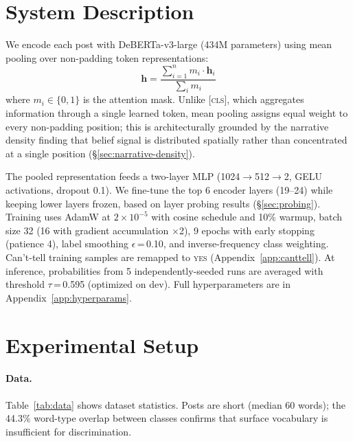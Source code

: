 \documentclass[11pt]{article}
\begin{document}
\section{System Description}
\label{sec:system}

We encode each post with DeBERTa-v3-large (434M parameters) using mean pooling over non-padding token representations:
\begin{equation}
  \mathbf{h} = \frac{\displaystyle\sum_{i=1}^{n} m_i \cdot \mathbf{h}_i}{\displaystyle\sum_i m_i}
  \label{eq:meanpool}
\end{equation}
where $m_i \in \{0,1\}$ is the attention mask.
Unlike \textsc{[cls]}, which aggregates information through a single learned token, mean pooling assigns equal weight to every non-padding position; this is architecturally grounded by the narrative density finding that belief signal is distributed spatially rather than concentrated at a single position (\S\ref{sec:narrative-density}).

The pooled representation feeds a two-layer MLP (1024$\to$512$\to$2, GELU activations, dropout 0.1).
We fine-tune the top 6 encoder layers (19--24) while keeping lower layers frozen, based on layer probing results (\S\ref{sec:probing}).
Training uses AdamW \citep{loshchilov2019adamw} at $2{\times}10^{-5}$ with cosine schedule and 10\% warmup, batch size 32 (16 with gradient accumulation $\times$2), 9 epochs with early stopping (patience 4), label smoothing $\epsilon$\,=\,0.10, and inverse-frequency class weighting.
Can't-tell training samples are remapped to \textsc{yes} (Appendix~\ref{app:canttell}).
At inference, probabilities from 5 independently-seeded runs are averaged with threshold $\tau$\,=\,0.595 (optimized on dev). Full hyperparameters are in Appendix~\ref{app:hyperparams}.

\section{Experimental Setup}
\label{sec:setup}

\paragraph{Data.}
Table~\ref{tab:data} shows dataset statistics.
Posts are short (median 60 words); the 44.3\% word-type overlap between classes confirms that surface vocabulary is insufficient for discrimination.
\end{document}
